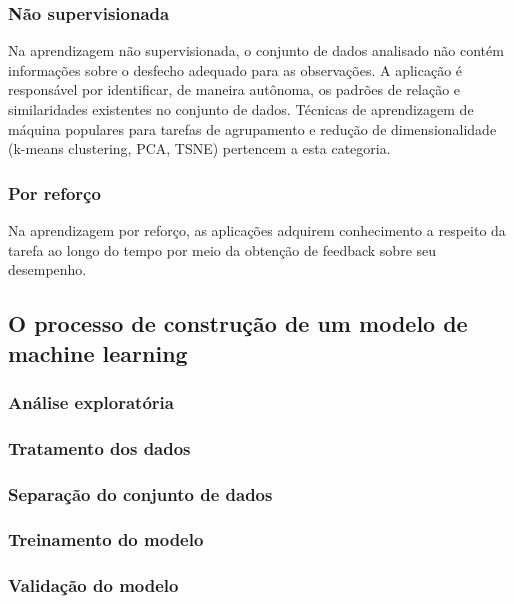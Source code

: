 \subsubsection{Não supervisionada}
Na aprendizagem não supervisionada, o conjunto de dados analisado não contém informações sobre o desfecho adequado para
as observações. A aplicação é responsável por identificar, de maneira autônoma, os padrões de relação e similaridades existentes
no conjunto de dados. Técnicas de aprendizagem de máquina populares para tarefas de agrupamento e redução de dimensionalidade
(k-means clustering, PCA, TSNE) pertencem a esta categoria.

\subsubsection{Por reforço}
Na aprendizagem por reforço, as aplicações adquirem conhecimento a respeito da tarefa ao longo do tempo por meio da obtenção
de feedback sobre seu desempenho.

\subsection{O processo de construção de um modelo de machine learning}
\subsubsection{Análise exploratória}
\subsubsection{Tratamento dos dados}
\subsubsection{Separação do conjunto de dados}
\subsubsection{Treinamento do modelo}
\subsubsection{Validação do modelo}
